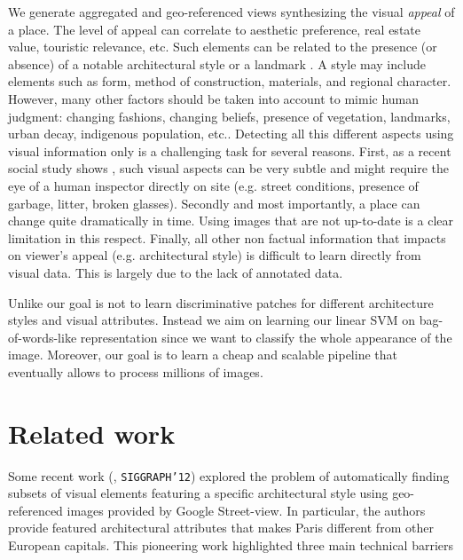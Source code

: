\documentclass[runningheads, table]{llncs}
\begin{document}

We generate aggregated and geo-referenced views synthesizing the visual \emph{appeal} of a place. The level of appeal can correlate to aesthetic preference, real estate value, touristic relevance, etc. 
Such elements can be related to the presence (or absence) of a notable architectural style or a landmark \cite{weyand2011discovering}. A style may include elements such as form, method of construction, materials, and regional character. 
However, many other factors should be taken into account to mimic human judgment: changing fashions, changing beliefs, presence of vegetation, landmarks, urban decay, indigenous population, etc.. Detecting all this different aspects using visual information only is a challenging task for several reasons. First, as a recent social study shows \cite{audit2011}, such visual aspects can be very subtle and might require the eye of a human inspector directly on site  (e.g. street conditions, presence of garbage, litter, broken glasses).
Secondly and most importantly, a place can change quite dramatically in time. Using images that are not up-to-date is a clear limitation in this respect. Finally, all other non factual information that impacts on viewer's appeal (e.g. architectural style) is difficult to learn directly from visual data. This is largely due to the lack of annotated data. 

Unlike \cite{Doersch} our goal is not to learn discriminative patches for different architecture styles and visual attributes. Instead we aim on learning our linear SVM on bag-of-words-like representation since we want to classify the whole appearance of the image. Moreover, our goal is to learn a cheap and scalable pipeline that eventually allows to process millions of images.


\section{Related work}

Some recent work (\cite{doersch2012what}, \texttt{SIGGRAPH'12}) explored the problem of automatically finding subsets of visual elements featuring a specific architectural style using geo-referenced images provided by Google Street-view. In particular, the authors provide featured architectural attributes that makes Paris different from other European capitals.
This pioneering work highlighted three main technical barriers 
\end{document}
